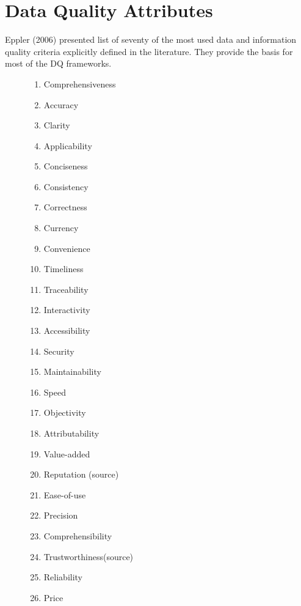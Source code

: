 \chapter{Data Quality Attributes}\label{ch:data-quality-attributes}

Eppler (2006) presented list of seventy of the most used data and information quality criteria explicitly defined in the literature.
They provide the basis for most of the DQ frameworks.

\begin{figure}[htb]
    \footnotesize

    \begin{multicols}{3}
        \begin{enumerate}
            \item Comprehensiveness
            \item Accuracy
            \item Clarity
            \item Applicability
            \item Conciseness
            \item Consistency
            \item Correctness
            \item Currency
            \item Convenience
            \item Timeliness
            \item Traceability
            \item Interactivity
            \item Accessibility
            \item Security
            \item Maintainability
            \item Speed
            \item Objectivity
            \item Attributability
            \item Value-added
            \item Reputation (source)
            \item Ease-of-use
            \item Precision
            \item Comprehensibility
            \item Trustworthiness\newline (source)
            \item Reliability
            \item Price 

\end{enumerate}
\end{multicols}
\end{figure}
